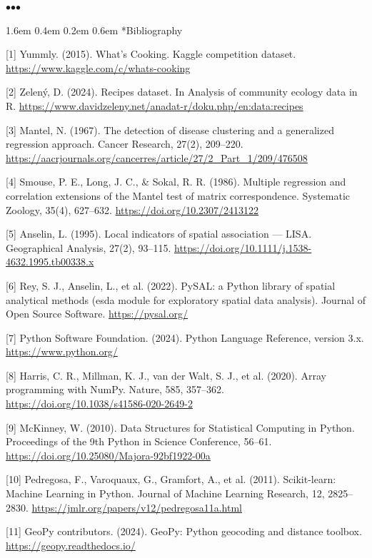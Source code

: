 \documentclass[11pt]{article}
\makeatletter
\renewcommand\section{\@startsection{section}{1}{\z@}%
  {1.6em \@plus 0.4em \@minus 0.2em}%
  {0.6em}%
  {\normalfont\Large\bfseries\color{black!85}}}
\newcommand{\sectionbreak}{%
  \par\nobreak\vspace{0.8em}%
  \par\centerline{\textcolor{black!40}{$\bullet$\quad$\bullet$\quad$\bullet$}}%
  \par\vspace{0.6em}\nobreak%
}
\makeatother
\begin{document}
\sectionbreak


\section*{Bibliography}


[1] Yummly. (2015). What's Cooking. Kaggle competition dataset. \url{https://www.kaggle.com/c/whats-cooking}


[2] Zelený, D. (2024). Recipes dataset. In Analysis of community ecology data in R. \url{https://www.davidzeleny.net/anadat-r/doku.php/en:data:recipes}


[3] Mantel, N. (1967). The detection of disease clustering and a generalized regression approach. Cancer Research, 27(2), 209–220. \url{https://aacrjournals.org/cancerres/article/27/2_Part_1/209/476508}


[4] Smouse, P. E., Long, J. C., \& Sokal, R. R. (1986). Multiple regression and correlation extensions of the Mantel test of matrix correspondence. Systematic Zoology, 35(4), 627–632. \url{https://doi.org/10.2307/2413122}


[5] Anselin, L. (1995). Local indicators of spatial association — LISA. Geographical Analysis, 27(2), 93–115. \url{https://doi.org/10.1111/j.1538-4632.1995.tb00338.x}


[6] Rey, S. J., Anselin, L., et al. (2022). PySAL: a Python library of spatial analytical methods (esda module for exploratory spatial data analysis). Journal of Open Source Software. \url{https://pysal.org/}


[7] Python Software Foundation. (2024). Python Language Reference, version 3.x. \url{https://www.python.org/}


[8] Harris, C. R., Millman, K. J., van der Walt, S. J., et al. (2020). Array programming with NumPy. Nature, 585, 357–362. \url{https://doi.org/10.1038/s41586-020-2649-2}


[9] McKinney, W. (2010). Data Structures for Statistical Computing in Python. Proceedings of the 9th Python in Science Conference, 56–61. \url{https://doi.org/10.25080/Majora-92bf1922-00a}


[10] Pedregosa, F., Varoquaux, G., Gramfort, A., et al. (2011). Scikit-learn: Machine Learning in Python. Journal of Machine Learning Research, 12, 2825–2830. \url{https://jmlr.org/papers/v12/pedregosa11a.html}


[11] GeoPy contributors. (2024). GeoPy: Python geocoding and distance toolbox. \url{https://geopy.readthedocs.io/}
\end{document}
